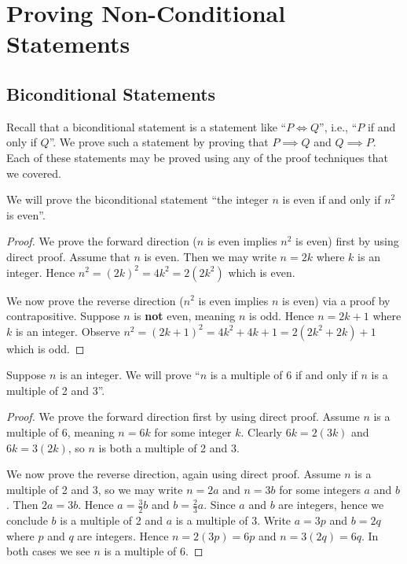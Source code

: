 \section{Proving Non-Conditional Statements}
\subsection{Biconditional Statements}
Recall that a biconditional statement is a statement like ``$P \iff Q$'', i.e., ``$P$ if and only if $Q$''. We prove such a statement by proving that $P \implies Q$ and $Q \implies P$. Each of these statements may be proved using any of the proof techniques that we covered.

\begin{example}
    We will prove the biconditional statement ``the integer $n$ is even if and only if $n^2$ is even''.
    \begin{proof}
        We prove the forward direction ($n$ is even implies $n^2$ is even) first by using direct proof. Assume that $n$ is even. Then we may write $n = 2k$ where $k$ is an integer. Hence $n^2 = (2k)^2 = 4k^2 = 2(2k^2)$ which is even.

        We now prove the reverse direction ($n^2$ is even implies $n$ is even) via a proof by contrapositive. Suppose $n$ is \textbf{not} even, meaning $n$ is odd. Hence $n = 2k + 1$ where $k$ is an integer. Observe $n^2 = (2k+1)^2 = 4k^2 + 4k + 1 = 2(2k^2 + 2k) + 1$ which is odd.
    \end{proof}
\end{example}
\begin{example}
    Suppose $n$ is an integer. We will prove ``$n$ is a multiple of 6 if and only if $n$ is a multiple of 2 and 3''.
    \begin{proof}
        We prove the forward direction first by using direct proof. Assume $n$ is a multiple of 6, meaning $n = 6k$ for some integer $k$. Clearly $6k = 2(3k)$ and $6k = 3(2k)$, so $n$ is both a multiple of 2 and 3.
        
        We now prove the reverse direction, again using direct proof. Assume $n$ is a multiple of 2 and 3, so we may write $n = 2a$ and $n = 3b$ for some integers $a$ and $b$. Then $2a = 3b$. Hence $a = \frac 32 b$ and $b = \frac 23 a$. Since $a$ and $b$ are integers, hence we conclude $b$ is a multiple of 2 and $a$ is a multiple of 3. Write $a = 3p$ and $b = 2q$ where $p$ and $q$ are integers. Hence $n = 2(3p) = 6p$ and $n = 3(2q) = 6q$. In both cases we see $n$ is a multiple of 6.
    \end{proof}
\end{example}

